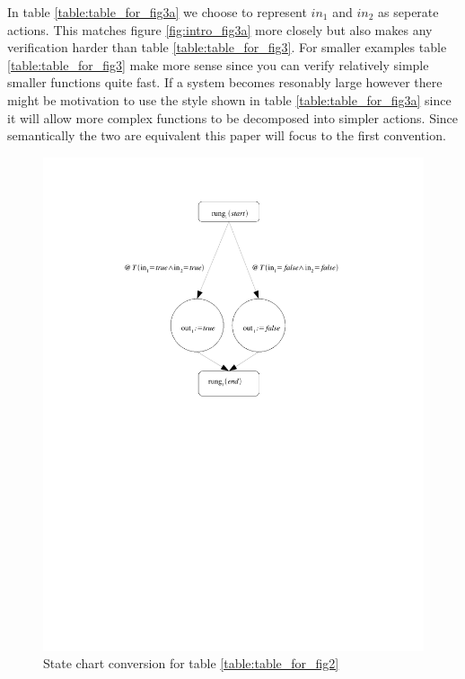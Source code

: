 In table \ref{table:table_for_fig3a} we choose to represent $in_1$ and $in_2$ as seperate actions. This matches figure
\ref{fig:intro_fig3a} more closely but also makes any verification harder than table \ref{table:table_for_fig3}. For
smaller examples table \ref{table:table_for_fig3} make more sense since you can verify relatively simple smaller functions
quite fast. If a system becomes resonably large however there might be motivation to use the style shown in 
table \ref{table:table_for_fig3a} since it will allow more complex functions to be decomposed into simpler actions.
Since semantically the two are equivalent this paper will focus to the first convention.




\pagebreak[4]

\begin{figure}[htp]
    \centering
    \includegraphics[trim= 50mm 140mm 50mm 10mm, clip ,width=\imgmedsmall]{./images/intro_and_graph.pdf} %
    \caption{State chart conversion for table \ref{table:table_for_fig2}}
    \label{fig:intro_and_graph}
\end{figure}

